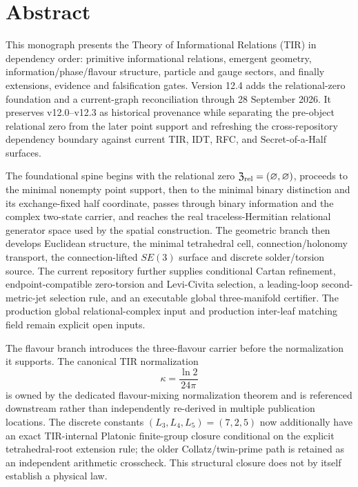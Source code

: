 \chapter*{Abstract}

This monograph presents the Theory of Informational Relations (TIR) in dependency order: primitive informational relations, emergent geometry, information/phase/flavour structure, particle and gauge sectors, and finally extensions, evidence and falsification gates. Version 12.4 adds the relational-zero foundation and a current-graph reconciliation through 28 September 2026. It preserves v12.0--v12.3 as historical provenance while separating the pre-object relational zero from the later point support and refreshing the cross-repository dependency boundary against current TIR, IDT, RFC, and Secret-of-a-Half surfaces.

The foundational spine begins with the relational zero \(\mathfrak Z_{\rm rel}=(\varnothing,\varnothing)\), proceeds to the minimal nonempty point support, then to the minimal binary distinction and its exchange-fixed half coordinate, passes through binary information and the complex two-state carrier, and reaches the real traceless-Hermitian relational generator space used by the spatial construction. The geometric branch then develops Euclidean structure, the minimal tetrahedral cell, connection/holonomy transport, the connection-lifted $SE(3)$ surface and discrete solder/torsion source. The current repository further supplies conditional Cartan refinement, endpoint-compatible zero-torsion and Levi-Civita selection, a leading-loop second-metric-jet selection rule, and an executable global three-manifold certifier. The production global relational-complex input and production inter-leaf matching field remain explicit open inputs.

The flavour branch introduces the three-flavour carrier before the normalization it supports. The canonical TIR normalization
\[
\kappa=\frac{\ln2}{24\pi}
\]
is owned by the dedicated flavour-mixing normalization theorem and is referenced downstream rather than independently re-derived in multiple publication locations. The discrete constants $(L_3,L_4,L_5)=(7,2,5)$ now additionally have an exact TIR-internal Platonic finite-group closure conditional on the explicit tetrahedral-root extension rule; the older Collatz/twin-prime path is retained as an independent arithmetic crosscheck. This structural closure does not by itself establish a physical law.

